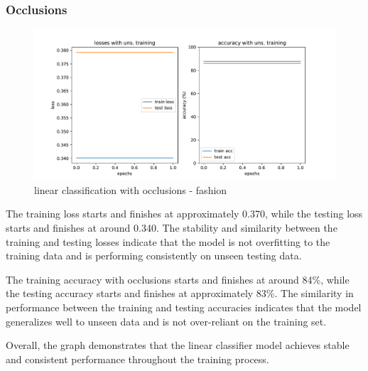\documentclass{midl} %
\begin{document}
\subsubsection{Occlusions}
\begin{figure}[H]
  \centering
  \includegraphics[width=1.2\textwidth]{linear_classif_occ_fashion.pdf}
  \caption{linear classification with occlusions - fashion}
  \label{fig:pdf-image}
\end{figure}
The training loss starts and finishes at approximately 0.370, while the testing loss starts and finishes at around 0.340. The stability and similarity between the training and testing losses indicate that the model is not overfitting to the training data and is performing consistently on unseen testing data.

The training accuracy with occlusions starts and finishes at around 84\%, while the testing accuracy starts and finishes at approximately 83\%. The similarity in performance between the training and testing accuracies indicates that the model generalizes well to unseen data and is not over-reliant on the training set.

Overall, the graph demonstrates that the linear classifier model achieves stable and consistent performance throughout the training process. 
\end{document}
